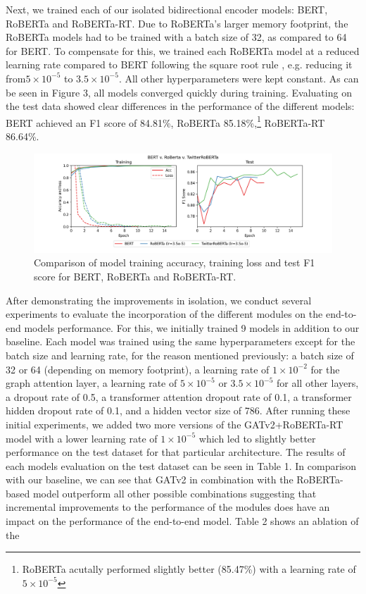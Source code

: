 \documentclass[letterpaper]{article} %
\begin{document}
Next, we trained each of our isolated bidirectional encoder models: BERT, RoBERTa and RoBERTa-RT. Due to RoBERTa's larger memory footprint, the RoBERTa models had to be trained with a batch size of 32, as compared to 64 for BERT. To compensate for this, we trained each RoBERTa model at a reduced learning rate compared to BERT following the square root rule \citep{Granziol2022}, e.g. reducing it from$5\times 10^{-5}$ to $3.5\times 10^{-5}$. All other hyperparameters were kept constant. As can be seen in Figure 3, all models converged quickly during training. Evaluating on the test data showed clear differences in the performance of the different models: BERT achieved an F1 score of 84.81\%, RoBERTa 85.18\%,\footnote{RoBERTa acutally performed slightly better (85.47\%) with a learning rate of $5\times 10^{-5}$} RoBERTa-RT 86.64\%.

\begin{figure}
    \includegraphics[width=\linewidth]{all_berts.png}
    \caption{Comparison of model training accuracy, training loss and test F1 score for BERT, RoBERTa and RoBERTa-RT.}
\end{figure}

After demonstrating the improvements in isolation, we conduct several experiments to evaluate the incorporation of the different modules on the end-to-end models performance. For this, we initially trained 9 models in addition to our baseline. Each model was trained using the same hyperparameters except for the batch size and learning rate, for the reason mentioned previously: a batch size of 32 or 64 (depending on memory footprint), a learning rate of $1\times 10^{-2}$ for the graph attention layer, a learning rate of $5\times 10^{-5}$ or $3.5\times 10^{-5}$ for all other layers, a dropout rate of 0.5, a transformer attention dropout rate of 0.1, a transformer hidden dropout rate of 0.1, and a hidden vector size of 786. After running these initial experiments, we added two more versions of the GATv2+RoBERTa-RT model with a lower learning rate of $1\times 10^{-5}$ which led to slightly better performance on the test dataset for that particular architecture. The results of each models evaluation on the test dataset can be seen in Table 1. In comparison with our baseline, we can see that GATv2 in combination with the RoBERTa-based model outperform all other possible combinations suggesting that incremental improvements to the performance of the modules does have an impact on the performance of the end-to-end model. Table 2 shows an ablation of the    
\end{document}
